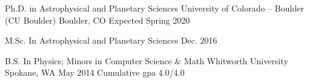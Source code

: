 

\begin{cventries}

  \cventry
    {Ph.D. in Astrophysical and Planetary Sciences} 
    {University of Colorado -- Boulder (CU Boulder)} %
    {Boulder, CO} %
    {Expected Spring 2020} %
    {}
 	
	\vspace{-0.225in}
  \cventry
    {M.Sc. In Astrophysical and Planetary Sciences} %
    {} %
    {} %
    {Dec. 2016} %
    {}

    \vspace{-0.15in}

  \cventry
    {B.S. In Physics; Minors in Computer Science \& Math }
    {Whitworth University}
    {Spokane, WA}
    {May 2014}
    {Cumulative gpa 4.0/4.0}
    \vspace{-0.15in}

\end{cventries}
